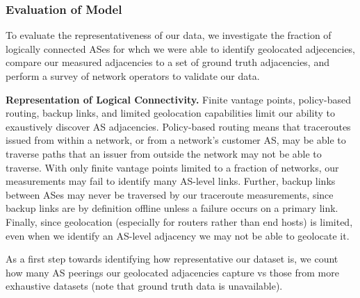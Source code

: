  
\subsubsection*{Evaluation of Model}

    To evaluate the representativeness of our data, we investigate the fraction
    of logically connected ASes for whch we were able to identify geolocated
    adjecencies, compare our measured adjacencies to a set of ground truth
    adjacencies, and perform a survey of network operators to validate our
    data.

    {\bf Representation of Logical Connectivity.} Finite vantage points,
    policy-based routing, backup links, and limited geolocation capabilities
    limit our ability to exaustively discover AS adjacencies.  Policy-based
    routing means that traceroutes issued from within a network, or from a
    network's customer AS, may be able to traverse paths that an issuer from
    outside the network may not be able to traverse.  With only finite vantage
    points limited to a fraction of networks, our measurements may fail to
    identify many AS-level links.  Further, backup links between ASes may never
    be traversed by our traceroute measurements, since backup links are by
    definition offline unless a failure occurs on a primary link.  Finally,
    since geolocation (especially for routers rather than end hosts) is
    limited, even when we identify an AS-level adjacency we may not be able to
    geolocate it.
    
    As a first step towards identifying how representative our dataset is, we
    count how many AS peerings our geolocated adjacencies capture vs those from
    more exhaustive datasets (note that ground truth data is unavailable).

